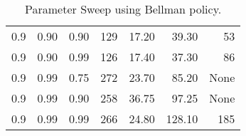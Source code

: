\begin{table}[h]
\begin{tabular}{r l r | r r r r}
			0.9 & 0.90 & 0.90 & 129  & 17.20 &  39.30 &   53 \\
			0.9 & 0.90 & 0.99 & 126  & 17.40 &  37.30 &   86 \\
			0.9 & 0.99 & 0.75 & 272  & 23.70 &  85.20 & None \\
			0.9 & 0.99 & 0.90 & 258  & 36.75 &  97.25 & None \\
			0.9 & 0.99 & 0.99 & 266  & 24.80 & 128.10 &  185 \\
		\bottomrule
	\end{tabular}
	\caption{Parameter Sweep using Bellman policy.}
\end{table}


